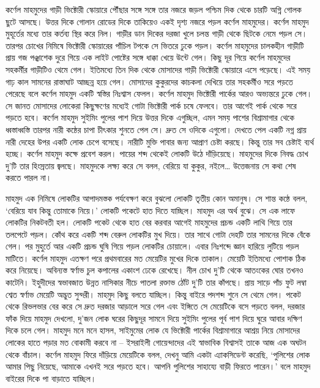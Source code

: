 \documentclass[
]{book}
\begin{document}
কর্ণেল মাহমুদের গাড়ী ভিক্টোরী স্কোয়ারে পৌঁছার সঙ্গে সঙ্গে তার নজরে জড়ল পশ্চিম দিক থেকে চারটি অগ্নি গোলক ছুটে আসছে। উত্তর দিকে গোলান রোডের দিকে তাকিয়েও একই দৃশ্য নজরে পড়ল কর্ণেল মাহমুদের। কর্ণেল মাহমুদ মুহূর্তের মধ্যে তার কর্তব্য স্থির করে নিল। গাড়ীর ডান দিকের দরজা খুলে চলন্ত গাড়ী থেকে ছিটকে নেমে পড়ল সে। তারপর চোখের নিমিষে ভিক্টোরী স্কোয়ারের পাঁচিল টপকে সে ভিতরে ঢুকে পড়ল। কর্ণেল মাহমুদের চালকহীন গাড়ীটি প্রায় গজ পঞ্ঝাশেক দুরে গিয়ে এক লাইট পোষ্টের সঙ্গে ধাক্কা খেয়ে উন্টে গেল। কিছু দূর গিয়ে কর্ণেল মাহমুদের সহকর্মীর গাড়ীটিও থেমে গেল। ইতিমধ্যে তিন দিক থেকে মোসাদের গাড়ী ভিক্টোরী স্কোয়ারে এসে পড়েছে। এই সময় গাঢ় কাল সামনের রাস্তাঘাট আচ্ছন্ন হয়ে গেল। মোসাদের কুকুরদের কাচকলা দেখিয়ে তার সহকর্মীও সরে পড়তে পেরেছে বলে কর্ণেল মাহমুদ একটি স্বস্তির নিঃশ্বাস ফেলল। কর্ণেল মাহমুদ ভিক্টোরী পার্কের আরও অভ্যন্তরে ঢুকে গেল। সে জানত মোসাদের লোকেরা কিছুক্ষণের মধ্যেই গোটা ভিক্টোরী পার্ক চষে ফেলবে। তার আগেই পার্ক থেকে সরে পড়তে হবে। কর্ণেল মাহমুদ সুইমিং পুলের পাশ দিয়ে উত্তর দিকে এগুচ্ছিল, এমন সময় পাশের বিশ্রামাগার থেকে ধ্বস্তাধ্বস্তি তারপর নারী কন্ঠের চাপা চীৎকার শুনতে পেল সে। দ্রুত সে ওদিকে এগুলো। দেখতে পেল একটি নগ্ন প্রায় নারী দেহের উপর একটি লোক চেপে বসেছে। নারীটি মুক্তি পাবার জন্য আপ্রাণ চেষ্টা করছে। কিন্তু তার সব চেষ্টাই ব্যর্থ হচ্ছে। কর্ণেল মাহমুদ কক্ষে প্রবেশ করল। পায়ের শব্দ থেকেই লোকটি উঠে দাঁড়িয়েছে। মাহমুদের দিকে নিবদ্ধ চোখ দু'টি তার হিংস্রতায় জ্বলছে। মাহমুদকে লক্ষ্য করে সে বলল, বেরিয়ে যা কুকুর, নইলে\ldots{} উত্তেজনায় সে কথা শেষ করতে পারল না।

মাহমুদ এক নিমিষে লোকটির আপাদমস্তক পর্যবেক্ষণ করে বুঝলো লোকটি তৃতীয় কোন অমানুষ। সে শান্ত কন্ঠে বলল, `বেরিয়ে যাব কিন্তু তোমাকে নিয়ে।' লোকটি পকেটে হাত দিতে যাচ্ছিল। মাহমুদ এর অর্থ বুঝে। সে এক লাফে লোকটির নিকটবতী হল। লোকটি পকেট থেকে হাত বের করবার আগেই মাহমুদের প্রচন্ড একটি লাথি গিয়ে তার তলপেটে পড়ল। কোঁথ করে একটি শব্দ বেরুল লোকটির মুখ দিয়ে। তার সাথে গোটা দেহটি তার সামনের দিকে বেঁকে গেল। পর মুহুর্তে আর একটি প্রচন্ড ঘুষি গিয়ে পড়ল লোকটির চোয়ালে। এবার নিঃশব্দে জ্ঞান হারিয়ে লুটিয়ে পড়ল মাটিতে। কর্ণেল মাহমুদ এতক্ষণ পরে প্রথমবারের মত মেয়েটির মুখের দিকে তাকাল। মেয়েটি ইতিমধ্যে পোশাক ঠিক করে নিয়েছে। অবিন্যস্ত স্বর্ণাভ চুল কপালের একাংশ ঢেকে রেখেছে। নীল চোখ দু'টি থেকে আতংকের ঘোর তখনও কাটেনি। ইহুদীদের স্বভাবজাত উন্নত নাসিকার নীচে পাতলা রক্তাভ ঠোঁট দু'টি তার কাঁপছে। প্রায় সাড়ে পাঁচ ফুট লম্বা শ্বেত স্বর্ণাভ মেয়েটি অদ্ভুত সুন্দরী। মাহমুদ কিছু বলতে যাচ্ছিল। কিন্তু বাইরে পদশব্দ শুনে সে থেমে গেল। পকেট থেকে রিভলভার বের করে সে দ্রুত দরজার আড়ালে সরে গেল এবং ইঙ্গিতে সে মেয়েটিকে বসে পড়তে বলল, দরজার ফাঁক দিয়ে মাহমুদ দেখলো, দু'জন লোক ঘরের কিছুদূর সামনে দিয়ে সুইমিং পুলের পূর্ব পাশ দিয়ে ঘুরে আবার দক্ষিণ দিকে চলে গেল। মাহমুদ মনে মনে হাসল, সাইমুমের লোক যে ভিক্টোরী পার্কের বিশ্রামাগারে আশ্রয় নিয়ে মোসাদের লোকের হাতে পড়ার মত বোকামী করবে না -- ইসরাইলী গোয়েন্দাদের এই স্বাভাবিক বিশ্বাসই তাকে আজ এক অঘটন থেকে বাঁচাল। কর্ণেল মাহমুদ ফিরে দাঁড়িয়ে মেয়েটিকে বলল, দেখনু আমি একটা এ্যাকসিডেন্ট করেছি, `পুলিশের লোক আমার পিছু নিয়েছে, আমাকে এখনই সরে পড়তে হবে। আপনি পুলিশের সাহায্যে বাড়ী ফিরতে পারেন।' বলে মাহমুদ বাইরের দিকে পা বাড়াতে যাচ্ছিল।
\end{document}
